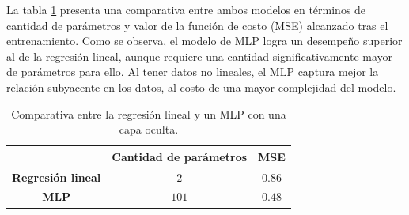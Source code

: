 
La tabla \ref{tab:regression_vs_mlp} presenta una comparativa entre ambos modelos en términos de cantidad de parámetros y valor de la función de costo (MSE) alcanzado tras el entrenamiento. Como se observa, el modelo de MLP logra un desempeño superior al de la regresión lineal, aunque requiere una cantidad significativamente mayor de parámetros para ello. Al tener datos no lineales, el MLP captura mejor la relación subyacente en los datos, al costo de una mayor complejidad del modelo.

\begin{table}[H]
    \centering
    \caption{Comparativa entre la regresión lineal y un MLP con una capa oculta.}
    \begin{tabular}{c c c}
        \toprule
        & \textbf{Cantidad de parámetros} & \textbf{MSE} \\
        \midrule
        \textbf{Regresión lineal} & $2$ & $0.86$ \\
        \textbf{MLP} & $101$ & $0.48$ \\
        \bottomrule
    \end{tabular}
    \label{tab:regression_vs_mlp}
\end{table}





